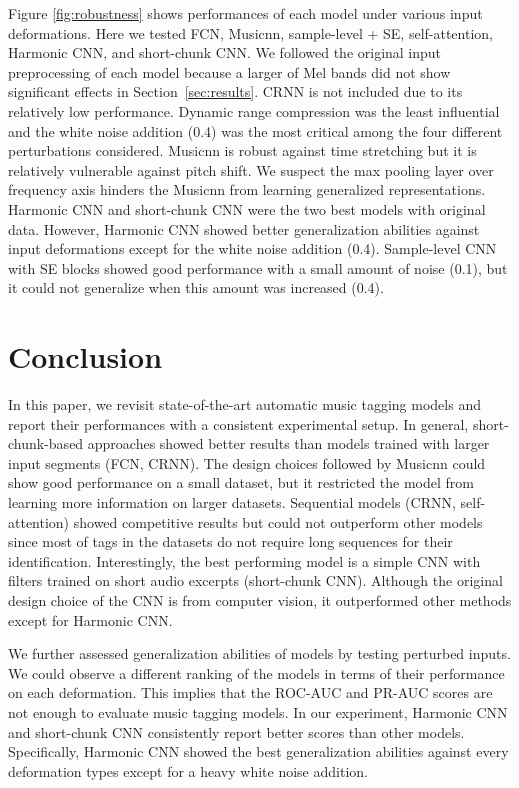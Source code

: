 \documentclass{article}
\begin{document}
Figure \ref{fig:robustness} shows performances of each model under various input deformations. Here we tested FCN, Musicnn, sample-level + SE, self-attention, Harmonic CNN, and short-chunk CNN. We followed the original input preprocessing of each model because a larger of Mel bands did not show significant effects in Section~\ref{sec:results}. CRNN is not included due to its relatively low performance. Dynamic range compression was the least influential and the white noise addition (0.4) was the most critical among the four different perturbations considered. Musicnn is robust against time stretching but it is relatively vulnerable against pitch shift. We suspect the max pooling layer over frequency axis hinders the Musicnn from learning generalized representations. Harmonic CNN and short-chunk CNN were the two best models with original data. However, Harmonic CNN showed better generalization abilities against input deformations except for the white noise addition (0.4). Sample-level CNN with SE blocks showed good performance with a small amount of noise (0.1), but it could not generalize when this amount was increased (0.4). \section{Conclusion}\label{sec:conclusion}
In this paper, we revisit state-of-the-art automatic music tagging models and report their performances with a consistent experimental setup. 
In general, short-chunk-based approaches showed better results than models trained with larger input segments (FCN, CRNN). The design choices followed by Musicnn could show good performance on a small dataset, but it restricted the model from learning more information on larger datasets.
Sequential models (CRNN, self-attention) showed competitive results but could not outperform other models since most of tags in the datasets do not require long sequences for their identification. Interestingly, the best performing model is a simple CNN with  filters trained on short audio excerpts (short-chunk CNN). Although the original design choice of the CNN is from computer vision, it outperformed other methods except for Harmonic CNN.

We further assessed generalization abilities of models by testing perturbed inputs. We could observe a different ranking of the models in terms of their performance on each deformation. This implies that the ROC-AUC and PR-AUC scores are not enough to evaluate music tagging models. In our experiment, Harmonic CNN and short-chunk CNN consistently report better scores than other models. Specifically, Harmonic CNN showed the best generalization abilities against every deformation types except for a heavy white noise addition. 
\end{document}
